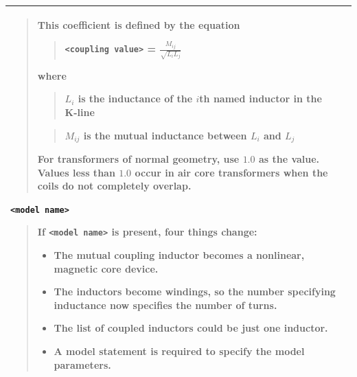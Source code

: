 \begin{longtable}[Hh]{>{\setlength{\hsize}{.2\hsize}}YY}
\begin{quote}
  This coefficient is defined by the equation
  \begin{quote}
    \texttt{<coupling value>} = $\frac{M_{ij}}{\sqrt{L_iL_j}}$
  \end {quote}

  where
  \begin{quote}
    $L_i$ is the inductance of the $i$th named inductor in the K-line
  \end {quote}
  \begin{quote}
    $M_{ij}$ is the mutual inductance between $L_i$ and $L_j$
  \end {quote}
  For transformers of normal geometry, use $1.0$ as the value. Values less
  than $1.0$ occur in air core transformers when the coils do not completely
  overlap.
\end{quote}
\texttt{<model name>}
\begin{quote}
  If \texttt{<model name>} is present, four things change:
  \begin{itemize}
    \item The mutual coupling inductor becomes a nonlinear, magnetic core device.
    \item The inductors become windings, so the number specifying inductance now
          specifies the number of turns.
    \item The list of coupled inductors could be just one inductor.
    \item A model statement is required to specify the model parameters.
  \end{itemize}
\end{quote}
\\ \hline

\end{longtable}

\addtocounter{table}{-1}

